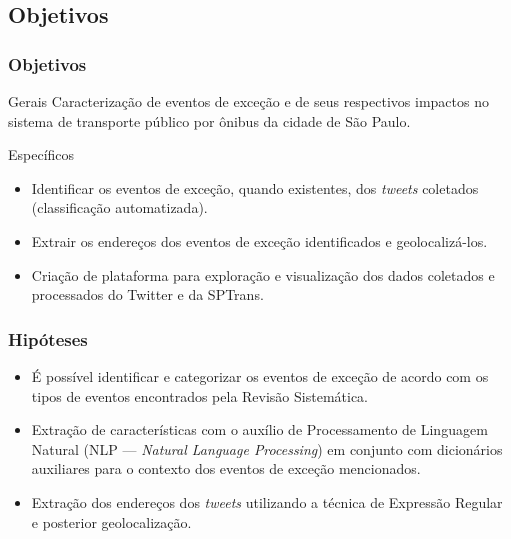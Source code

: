 \documentclass{beamer}
\begin{document}
\subsection{Objetivos}
\begin{frame}
\frametitle{Objetivos}
\begin{block}{Gerais}
Caracterização de eventos de exceção e de seus respectivos impactos no sistema de transporte público por ônibus da cidade de São Paulo.
\end{block}
\begin{block}{Específicos}
\begin{itemize}
    \item Identificar os eventos de exceção, quando existentes, dos \textit{tweets} coletados (\alert{classificação automatizada}).
     \item Extrair os endereços dos eventos de exceção identificados e geolocalizá-los.
\item Criação de plataforma para exploração e visualização dos dados coletados e processados do Twitter e da SPTrans.
\end{itemize}
\end{block}
\end{frame}
\begin{frame}
\frametitle{Hipóteses}

\begin{itemize}

\item É possível identificar e categorizar os eventos de exceção de acordo com os tipos de eventos encontrados pela Revisão Sistemática.

\item Extração de características com o auxílio de Processamento de Linguagem Natural (NLP --- \textit{Natural Language Processing}) em conjunto com dicionários auxiliares para o contexto dos eventos de exceção mencionados.

\item Extração dos endereços dos \textit{tweets} utilizando a técnica de Expressão Regular e posterior geolocalização.
\end{itemize}

\end{frame}
\end{document}
